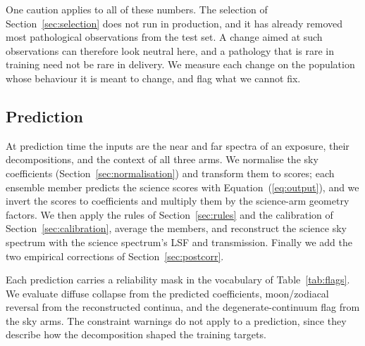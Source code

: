 One caution applies to all of these numbers. The selection of
Section~\ref{sec:selection} does not run in production, and it has already
removed most pathological observations from the test set. A change aimed at
such observations can therefore look neutral here, and a pathology that is
rare in training need not be rare in delivery. We measure each change on
the population whose behaviour it is meant to change, and flag what we
cannot fix.

\subsection{Prediction}

At prediction time the inputs are the near and far spectra of an exposure,
their decompositions, and the context of all three arms. We normalise the
sky coefficients (Section~\ref{sec:normalisation}) and transform them to
scores; each ensemble member predicts the science scores with
Equation~(\ref{eq:output}), and we invert the scores to coefficients and
multiply them by the science-arm geometry factors. We then apply the rules
of Section~\ref{sec:rules} and the calibration of
Section~\ref{sec:calibration}, average the members, and reconstruct the
science sky spectrum with the science spectrum's LSF and transmission.
Finally we add the two empirical corrections of Section~\ref{sec:postcorr}.

Each prediction carries a reliability mask in the vocabulary of
Table~\ref{tab:flags}. We evaluate diffuse collapse from the predicted
coefficients, moon/zodiacal reversal from the reconstructed continua, and
the degenerate-continuum flag from the sky arms. The constraint warnings do
not apply to a prediction, since they describe how the decomposition shaped
the training targets.

